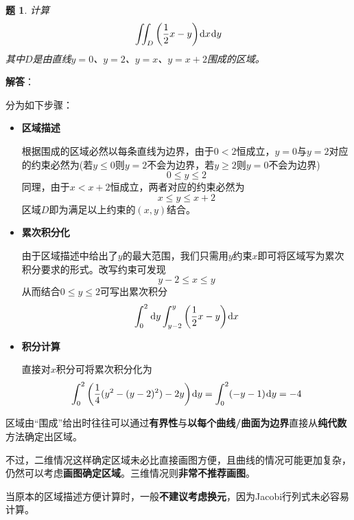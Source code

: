 \documentclass[a4paper,UTF8,fontset=windows,AutoFakeBold]{ctexart}
\newcommand*{\dr}{\hspace{0.07em}\mathrm{d}}
\newcommand*{\note}{\noindent *}
\theoremstyle{ex}
\newtheorem{exercise}{题}
\newcommand{\sol}[1]{{\vspace{5pt}\kaishu\noindent\textbf{解答}：\vspace{-3pt}
\begin{compactitem}
    \item[] #1
\end{compactitem}
}}
\begin{document}
\begin{framed}
\begin{exercise}
    计算
    $$\iint_D\bigg(\frac{1}{2}x-y\bigg)\dr x\dr y$$
    其中$D$是由直线$y=0$、$y=2$、$y=x$、$y=x+2$围成的区域。
\end{exercise}
\sol{
    分为如下步骤：
    \begin{itemize}
        \item \textbf{区域描述}
        
        根据围成的区域必然以每条直线为边界，由于$0<2$恒成立，$y=0$与$y=2$对应的约束必然为(若$y\le0$则$y=2$不会为边界，若$y\ge2$则$y=0$不会为边界)
        $$0\le y\le2$$
        同理，由于$x<x+2$恒成立，两者对应的约束必然为
        $$x\le y\le x+2$$
        区域$D$即为满足以上约束的$(x,y)$结合。

        \item \textbf{累次积分化}
        
        由于区域描述中给出了$y$的最大范围，我们只需用$y$约束$x$即可将区域写为累次积分要求的形式。改写约束可发现
        $$y-2\le x\le y$$
        从而结合$0\le y\le2$可写出累次积分
        $$\int_0^2\dr y\int_{y-2}^y\bigg(\frac{1}{2}x-y\bigg)\dr x$$

        \item \textbf{积分计算}
        
        直接对$x$积分可将累次积分化为
        $$\int_0^2\bigg(\frac{1}{4}(y^2-(y-2)^2)-2y\bigg)\dr y=\int_0^2(-y-1)\dr y=-4$$
    \end{itemize}
}
\end{framed}

\note 区域由``围成''给出时往往可以通过\textbf{有界性}与\textbf{以每个曲线/曲面为边界}直接从\textbf{纯代数}方法确定出区域。

\note 不过，二维情况这样确定区域未必比直接画图方便，且曲线的情况可能更加复杂，仍然可以考虑\textbf{画图确定区域}。三维情况则\textbf{非常不推荐画图}。

\note 当原本的区域描述方便计算时，一般\textbf{不建议考虑换元}，因为Jacobi行列式未必容易计算。
\end{document}
